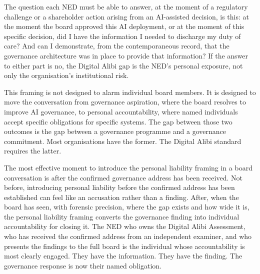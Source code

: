 The question each NED must be able to answer, at the moment of a regulatory challenge or a shareholder action arising from an AI-assisted decision, is this: at the moment the board approved this AI deployment, or at the moment of this specific decision, did I have the information I needed to discharge my duty of care? And can I demonstrate, from the contemporaneous record, that the governance architecture was in place to provide that information? If the answer to either part is no, the Digital Alibi gap is the NED's personal exposure, not only the organisation's institutional risk.

This framing is not designed to alarm individual board members. It is designed to move the conversation from governance aspiration, where the board resolves to improve AI governance, to personal accountability, where named individuals accept specific obligations for specific systems. The gap between those two outcomes is the gap between a governance programme and a governance commitment. Most organisations have the former. The Digital Alibi standard requires the latter.

The most effective moment to introduce the personal liability framing in a board conversation is after the confirmed governance address has been received. Not before, introducing personal liability before the confirmed address has been established can feel like an accusation rather than a finding. After, when the board has seen, with forensic precision, where the gap exists and how wide it is, the personal liability framing converts the governance finding into individual accountability for closing it. The NED who owns the Digital Alibi Assessment, who has received the confirmed address from an independent examiner, and who presents the findings to the full board is the individual whose accountability is most clearly engaged. They have the information. They have the finding. The governance response is now their named obligation.

